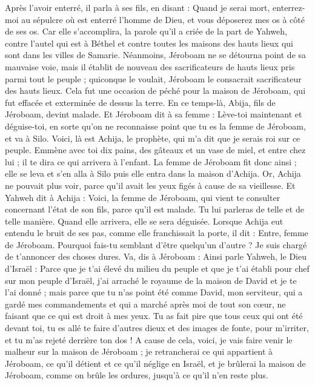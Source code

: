 \begin{multicols}{2}
Après l’avoir enterré, il parla à ses fils, en disant : Quand je serai mort, enterrez-moi au sépulcre où est enterré l'homme de Dieu, et vous déposerez mes os à côté de ses os.
Car elle s’accomplira, la parole qu’il a criée de la part de Yahweh, contre l'autel qui est à Béthel et contre toutes les maisons des hauts lieux qui sont dans les villes de Samarie.
Néanmoins, Jéroboam ne se détourna point de sa mauvaise voie, mais il établit de nouveau des sacrificateurs de hauts lieux pris parmi tout le peuple ; quiconque le voulait, Jéroboam le consacrait sacrificateur des hauts lieux.
Cela fut une occasion de péché pour la maison de Jéroboam, qui fut effacée et exterminée de dessus la terre.
\VerseOne{}En ce temps-là, Abija, fils de Jéroboam, devint malade.
Et Jéroboam dit à sa femme : Lève-toi maintenant et déguise-toi, en sorte qu'on ne reconnaisse point que tu es la femme de Jéroboam, et va à Silo. Voici, là est Achija, le prophète, qui m'a dit que je serais roi sur ce peuple.
Emmène avec toi dix pains, des gâteaux et un vase de miel, et entre chez lui ; il te dira ce qui arrivera à l’enfant.
La femme de Jéroboam fit donc ainsi ; elle se leva et s'en alla à Silo puis elle entra dans la maison d'Achija. Or, Achija ne pouvait plus voir, parce qu’il avait les yeux figés à cause de sa vieillesse.
Et Yahweh dit à Achija : Voici, la femme de Jéroboam, qui vient te consulter concernant l’état de son fils, parce qu'il est malade. Tu lui parleras de telle et de telle manière. Quand elle arrivera, elle se sera déguisée.
Lorsque Achija eut entendu le bruit de ses pas, comme elle franchissait la porte, il dit : Entre, femme de Jéroboam. Pourquoi fais-tu semblant d'être quelqu’un d’autre ? Je suis chargé de t’annoncer des choses dures.
Va, dis à Jéroboam : Ainsi parle Yahweh, le Dieu d'Israël : Parce que je t'ai élevé du milieu du peuple et que je t'ai établi pour chef sur mon peuple d'Israël,
j'ai arraché le royaume de la maison de David et je te l'ai donné ; mais parce que tu n'as point été comme David, mon serviteur, qui a gardé mes commandements et qui a marché après moi de tout son cœur, ne faisant que ce qui est droit à mes yeux.
Tu as fait pire que tous ceux qui ont été devant toi, tu es allé te faire d'autres dieux et des images de fonte, pour m'irriter, et tu m'as rejeté derrière ton dos !
A cause de cela, voici, je vais faire venir le malheur sur la maison de Jéroboam ; je retrancherai ce qui appartient à Jéroboam, ce qu’il détient et ce qu’il néglige en Israël, et je brûlerai la maison de Jéroboam, comme on brûle les ordures, jusqu'à ce qu'il n'en reste plus.

\end{multicols}
